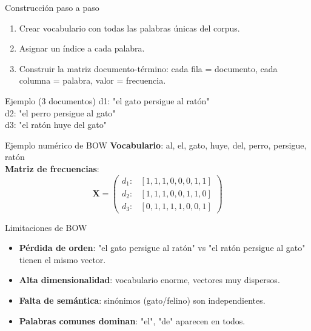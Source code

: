 \documentclass[aspectratio=169, 10pt, xcolor=table]{beamer}
\begin{document}
\begin{frame}{Construcción paso a paso}
    \begin{enumerate}
        \item Crear vocabulario con todas las palabras únicas del corpus.
        \item Asignar un índice a cada palabra.
        \item Construir la matriz documento-término: cada fila = documento, cada columna = palabra, valor = frecuencia.
    \end{enumerate}
    \vspace{0.3cm}
    \begin{exampleblock}{Ejemplo (3 documentos)}
        d1: "el gato persigue al ratón" \\
        d2: "el perro persigue al gato" \\
        d3: "el ratón huye del gato"
    \end{exampleblock}
\end{frame}

\begin{frame}{Ejemplo numérico de BOW}
    \textbf{Vocabulario}: al, el, gato, huye, del, perro, persigue, ratón \\
    \textbf{Matriz de frecuencias}:
    \[
    \mathbf{X} = \begin{pmatrix}
    d_1: & [1, 1, 1, 0, 0, 0, 1, 1] \\
    d_2: & [1, 1, 1, 0, 0, 1, 1, 0] \\
    d_3: & [0, 1, 1, 1, 1, 0, 0, 1]
    \end{pmatrix}
    \]
\end{frame}

\begin{frame}{Limitaciones de BOW}
    \begin{itemize}
        \item \textbf{Pérdida de orden}: "el gato persigue al ratón" vs "el ratón persigue al gato" tienen el mismo vector.
        \item \textbf{Alta dimensionalidad}: vocabulario enorme, vectores muy dispersos.
        \item \textbf{Falta de semántica}: sinónimos (gato/felino) son independientes.
        \item \textbf{Palabras comunes dominan}: "el", "de" aparecen en todos.
    \end{itemize}
\end{frame}
\end{document}
